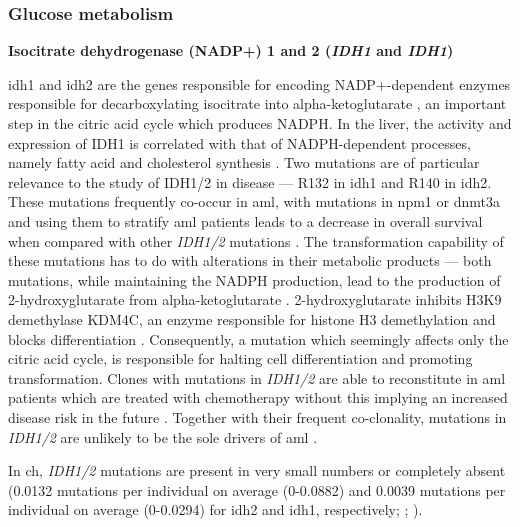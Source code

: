 \subsubsection{Glucose metabolism}

\noindent \textbf{Isocitrate dehydrogenase (NADP+) 1 and 2 (\textit{IDH1} and \textit{IDH1})}

\Ac{idh1} and \ac{idh2} are the genes responsible for encoding NADP+-dependent enzymes responsible for decarboxylating isocitrate into alpha-ketoglutarate \cite{Nekrutenko1998-ld}, an important step in the citric acid cycle which produces NADPH. In the liver, the activity and expression of IDH1 is correlated with that of NADPH-dependent processes, namely fatty acid and cholesterol synthesis \cite{Shechter2003-vd}. Two mutations are of particular relevance to the study of IDH1/2 in disease --- R132 in \ac{idh1} and R140 in \ac{idh2}. These mutations frequently co-occur in \ac{aml}, with mutations in \ac{npm1} or \ac{dnmt3a} and using them to stratify \ac{aml} patients leads to a decrease in overall survival when compared with other \textit{IDH1/2} mutations \cite{Meggendorfer2018-me,Mardis2009-gl}. The transformation capability of these mutations has to do with alterations in their metabolic products --- both mutations, while maintaining the NADPH production, lead to the production of 2-hydroxyglutarate from alpha-ketoglutarate \cite{Ward2010-fi}. 2-hydroxyglutarate inhibits H3K9 demethylase KDM4C, an enzyme responsible for histone H3 demethylation and blocks differentiation \cite{Lu2012-ix}. Consequently, a mutation which seemingly affects only the citric acid cycle, is responsible for halting cell differentiation and promoting transformation. Clones with mutations in \textit{IDH1/2} are able to reconstitute in \ac{aml} patients which are treated with chemotherapy without this implying an increased disease risk in the future \cite{Wiseman2016-kw}. Together with their frequent co-clonality, mutations in \textit{IDH1/2} are unlikely to be the sole drivers of \ac{aml} \cite{Hasserjian2020-qj}.

In \ac{ch}, \textit{IDH1/2} mutations are present in very small numbers or completely absent \cite{Jaiswal2014-rl,Genovese2014-eu,Zink2017-zi,Bolton2020-ct,Coombs2017-ph,McKerrell2015-rl,Acuna-Hidalgo2017-ng,Desai2018-pj,Young2016-du,Young2019-rz} (0.0132 mutations per individual on average (0-0.0882) and 0.0039 mutations per individual on average (0-0.0294) for \ac{idh2} and \ac{idh1}, respectively; ; ). 

